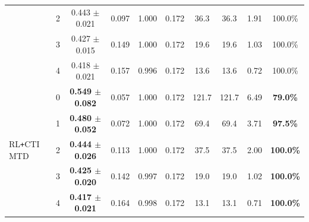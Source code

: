\begin{table}[htbp]
\begin{tabular}{@{}lccccccccc@{}}
& 2 & 0.443 $\pm$ 0.021 & 0.097 & 1.000 & 0.172 & 36.3 & 36.3 & 1.91 & 100.0\% \\
& 3 & 0.427 $\pm$ 0.015 & 0.149 & 1.000 & 0.172 & 19.6 & 19.6 & 1.03 & 100.0\% \\
& 4 & 0.418 $\pm$ 0.021 & 0.157 & 0.996 & 0.172 & 13.6 & 13.6 & 0.72 & 100.0\% \\
\midrule
\multirow{5}{*}{RL\texttt{+}CTI MTD}
& 0 & \textbf{0.549 $\pm$ 0.082} & 0.057 & 1.000 & 0.172 & 121.7 & 121.7 & 6.49 & \textbf{79.0\%} \\
& 1 & \textbf{0.480 $\pm$ 0.052} & 0.072 & 1.000 & 0.172 & 69.4 & 69.4 & 3.71 & \textbf{97.5\%} \\
& 2 & \textbf{0.444 $\pm$ 0.026} & 0.113 & 1.000 & 0.172 & 37.5 & 37.5 & 2.00 & \textbf{100.0\%} \\
& 3 & \textbf{0.425 $\pm$ 0.020} & 0.142 & 0.997 & 0.172 & 19.0 & 19.0 & 1.02 & \textbf{100.0\%} \\
& 4 & \textbf{0.417 $\pm$ 0.021} & 0.164 & 0.998 & 0.172 & 13.1 & 13.1 & 0.71 & \textbf{100.0\%} \\
\bottomrule
\end{tabular}
\end{table}
